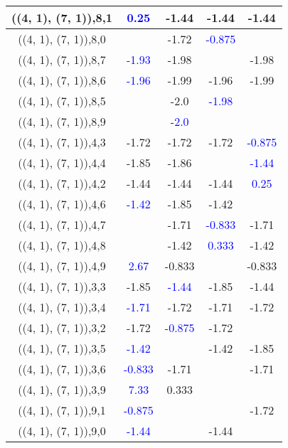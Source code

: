 \documentclass{article}
\begin{document}
\begin{center}
\begin{longtable}{|c|c|c|c|c|}
        	\hline
        	((4, 1), (7, 1)),8,1& \textcolor{blue}{0.25}&-1.44&-1.44&-1.44\\
        	\hline
        	((4, 1), (7, 1)),8,0&&-1.72& \textcolor{blue}{-0.875}&\\
        	\hline
        	((4, 1), (7, 1)),8,7& \textcolor{blue}{-1.93}&-1.98&&-1.98\\
        	\hline
        	((4, 1), (7, 1)),8,6& \textcolor{blue}{-1.96}&-1.99&-1.96&-1.99\\
        	\hline
        	((4, 1), (7, 1)),8,5&&-2.0& \textcolor{blue}{-1.98}&\\
        	\hline
        	((4, 1), (7, 1)),8,9&& \textcolor{blue}{-2.0}&&\\
        	\hline
        	((4, 1), (7, 1)),4,3&-1.72&-1.72&-1.72& \textcolor{blue}{-0.875}\\
        	\hline
        	((4, 1), (7, 1)),4,4&-1.85&-1.86&& \textcolor{blue}{-1.44}\\
        	\hline
        	((4, 1), (7, 1)),4,2&-1.44&-1.44&-1.44& \textcolor{blue}{0.25}\\
        	\hline
        	((4, 1), (7, 1)),4,6& \textcolor{blue}{-1.42}&-1.85&-1.42&\\
        	\hline
        	((4, 1), (7, 1)),4,7&&-1.71& \textcolor{blue}{-0.833}&-1.71\\
        	\hline
        	((4, 1), (7, 1)),4,8&&-1.42& \textcolor{blue}{0.333}&-1.42\\
        	\hline
        	((4, 1), (7, 1)),4,9& \textcolor{blue}{2.67}&-0.833&&-0.833\\
        	\hline
        	((4, 1), (7, 1)),3,3&-1.85& \textcolor{blue}{-1.44}&-1.85&-1.44\\
        	\hline
        	((4, 1), (7, 1)),3,4& \textcolor{blue}{-1.71}&-1.72&-1.71&-1.72\\
        	\hline
        	((4, 1), (7, 1)),3,2&-1.72& \textcolor{blue}{-0.875}&-1.72&\\
        	\hline
        	((4, 1), (7, 1)),3,5& \textcolor{blue}{-1.42}&&-1.42&-1.85\\
        	\hline
        	((4, 1), (7, 1)),3,6& \textcolor{blue}{-0.833}&-1.71&&-1.71\\
        	\hline
        	((4, 1), (7, 1)),3,9& \textcolor{blue}{7.33}&0.333&&\\
        	\hline
        	((4, 1), (7, 1)),9,1& \textcolor{blue}{-0.875}&&&-1.72\\
        	\hline
        	((4, 1), (7, 1)),9,0& \textcolor{blue}{-1.44}&&-1.44&\\

\end{longtable}
\end{center}
\end{document}
